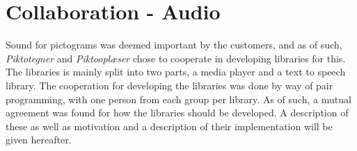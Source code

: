 \chapter{Collaboration - Audio}
Sound for pictograms was deemed important by the customers, and as of such, \textit{Piktotegner} and \textit{Piktooplæser} chose to cooperate in developing libraries for this.
The libraries is mainly split into two parts, a media player and a text to speech library.
The cooperation for developing the libraries was done by way of pair programming, with one person from each group per library.
As of such, a mutual agreement was found for how the libraries should be developed.
A description of these as well as motivation and a description of their implementation will be given hereafter.





